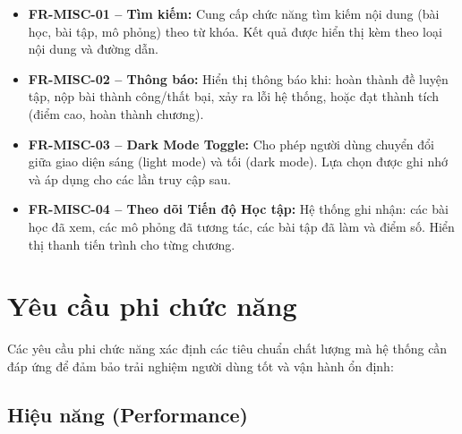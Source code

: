 \begin{itemize}
    \item \textbf{FR-MISC-01 – Tìm kiếm:} Cung cấp chức năng tìm kiếm nội dung (bài học, bài tập, mô phỏng) theo từ khóa. Kết quả được hiển thị kèm theo loại nội dung và đường dẫn.
    
    \item \textbf{FR-MISC-02 – Thông báo:} Hiển thị thông báo khi: hoàn thành đề luyện tập, nộp bài thành công/thất bại, xảy ra lỗi hệ thống, hoặc đạt thành tích (điểm cao, hoàn thành chương).
    
    \item \textbf{FR-MISC-03 – Dark Mode Toggle:} Cho phép người dùng chuyển đổi giữa giao diện sáng (light mode) và tối (dark mode). Lựa chọn được ghi nhớ và áp dụng cho các lần truy cập sau.
    
    \item \textbf{FR-MISC-04 – Theo dõi Tiến độ Học tập:} Hệ thống ghi nhận: các bài học đã xem, các mô phỏng đã tương tác, các bài tập đã làm và điểm số. Hiển thị thanh tiến trình cho từng chương.
\end{itemize}

\section{Yêu cầu phi chức năng}

Các yêu cầu phi chức năng xác định các tiêu chuẩn chất lượng mà hệ thống cần đáp ứng để đảm bảo trải nghiệm người dùng tốt và vận hành ổn định:

\subsection{Hiệu năng (Performance)}


